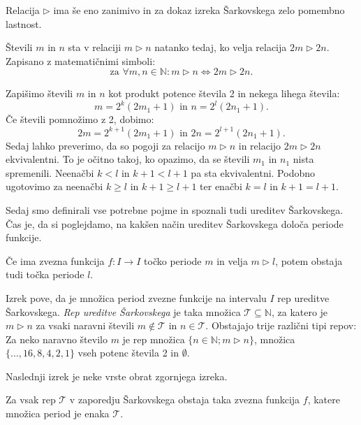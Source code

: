 \documentclass[mat2]{fmfdelo}
\newcommand{\N}{\mathbb N}
\begin{document}
Relacija $\triangleright$ ima še eno zanimivo in za dokaz izreka Šarkovskega zelo pomembno lastnost.
\begin{trditev}\label{trd:doubling}
Števili $m$ in $n$ sta v relaciji $m \triangleright n$ natanko tedaj, ko velja relacija $2m \triangleright 2n$. Zapisano z matematičnimi simboli:
$$\text{za } \forall m, n \in \N: m \triangleright n \Leftrightarrow 2m \triangleright 2n.$$
\end{trditev}
\begin{dokaz}
Zapišimo števili $m$ in $n$ kot produkt potence števila 2 in nekega lihega števila:
$$m= 2^k(2m_1 +1)\text{ in } n= 2^l(2n_1 +1).$$
Če števili pomnožimo z 2, dobimo:
$$2m= 2^{k+1}(2m_1 +1)\text{ in } 2n= 2^{l+1}(2n_1 +1).$$
Sedaj lahko preverimo, da so pogoji za relacijo $m \triangleright n$ in relacijo $2m \triangleright 2n$ ekvivalentni. To je očitno takoj, ko opazimo, da se števili $m_1$ in $n_1$ nista spremenili. Neenačbi $k<l$ in $k+1<l+1$ pa sta ekvivalentni. Podobno ugotovimo za neenačbi $k \geq l$ in $k+1 \geq l+1$ ter enačbi $k=l$ in $k+1 = l+1$.
\end{dokaz}

Sedaj smo definirali vse potrebne pojme in spoznali tudi ureditev Šarkovskega. Čas je, da si poglejdamo, na kakšen način ureditev Šarkovskega določa periode funkcije.

\begin{izrek}\label{izr:forcing}
Če ima zvezna funkcija $f : I \to I$ točko periode $m$ in velja $ m \triangleright l$, potem obstaja tudi točka periode $l$.
\end{izrek}
Izrek pove, da je množica period zvezne funkcije na intervalu $I$ rep ureditve Šarkovskega. \emph{Rep ureditve Šarkovskega} je taka množica $\mathcal{T} \subseteq \N$, za katero je $m \triangleright n$ za  vsaki naravni števili $m \notin \mathcal{T}$ in $n \in \mathcal{T}$. Obstajajo trije različni tipi repov:  Za neko naravno število $m$ je rep množica $\{n \in \N; m \triangleright n\}$, množica $\{\dots, 16, 8, 4, 2, 1\}$ vseh potenc števila 2 in $\emptyset$.

Naslednji izrek je neke vrste obrat zgornjega izreka.

\begin{izrek}\label{izr:realization}
Za vsak rep $\mathcal{T}$ v zaporedju Šarkovskega obstaja taka zvezna funkcija $f$, katere množica period je enaka $\mathcal{T}$.
\end{izrek}
\end{document}
